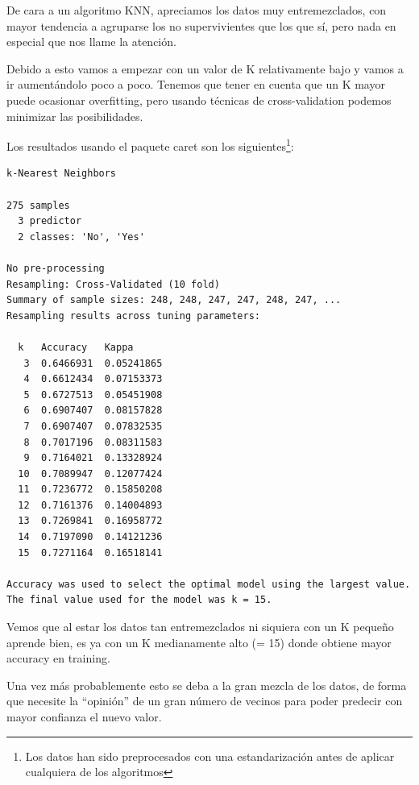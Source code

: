 De cara a un algoritmo KNN, apreciamos los datos muy entremezclados, con mayor tendencia a agruparse los no supervivientes que los que sí, pero nada en especial que nos llame la atención.

Debido a esto vamos a empezar con un valor de K relativamente bajo y vamos a ir aumentándolo poco a poco. Tenemos que tener en cuenta que un K mayor puede ocasionar overfitting, pero usando técnicas de cross-validation podemos minimizar las posibilidades.

\vspace{\baselineskip}

Los resultados usando el paquete caret son los siguientes\footnote{Los datos han sido preprocesados con una estandarización antes de aplicar cualquiera de los algoritmos}:
\begin{verbatim}
k-Nearest Neighbors 

275 samples
  3 predictor
  2 classes: 'No', 'Yes' 

No pre-processing
Resampling: Cross-Validated (10 fold) 
Summary of sample sizes: 248, 248, 247, 247, 248, 247, ... 
Resampling results across tuning parameters:

  k   Accuracy   Kappa     
   3  0.6466931  0.05241865
   4  0.6612434  0.07153373
   5  0.6727513  0.05451908
   6  0.6907407  0.08157828
   7  0.6907407  0.07832535
   8  0.7017196  0.08311583
   9  0.7164021  0.13328924
  10  0.7089947  0.12077424
  11  0.7236772  0.15850208
  12  0.7161376  0.14004893
  13  0.7269841  0.16958772
  14  0.7197090  0.14121236
  15  0.7271164  0.16518141

Accuracy was used to select the optimal model using the largest value.
The final value used for the model was k = 15.
\end{verbatim}

Vemos que al estar los datos tan entremezclados ni siquiera con un K pequeño aprende bien, es ya con un K medianamente alto (= 15) donde obtiene mayor accuracy en training.

\vspace{\baselineskip}

Una vez más probablemente esto se deba a la gran mezcla de los datos, de forma que necesite la ``opinión'' de un gran número de vecinos para poder predecir con mayor confianza el nuevo valor.

